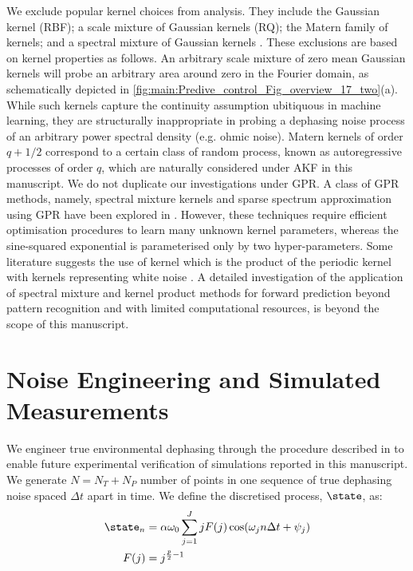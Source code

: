 We exclude popular kernel choices from analysis. They include the Gaussian kernel (RBF); a scale mixture of Gaussian kernels (RQ); the Matern family of kernels; and a spectral mixture of Gaussian kernels \cite{rasmussen2005gaussian, tobar2015learning}. These exclusions are based on kernel properties as follows. An arbitrary scale mixture of zero mean Gaussian kernels will probe an arbitrary area around zero in the Fourier domain, as schematically depicted in \cref{fig:main:Predive_control_Fig_overview_17_two}(a). While such kernels capture the continuity assumption ubitiquous in machine learning, they are structurally inappropriate in probing a dephasing noise process of an arbitrary power spectral density (e.g. ohmic noise).  Matern kernels of order $q + 1/2$ correspond to a certain class of random process, known as autoregressive processes of order $q$, which are naturally considered under AKF in this manuscript. We do not duplicate our investigations under GPR. A class of GPR methods, namely, spectral mixture kernels and sparse spectrum approximation using GPR have been explored in \cite{wilson2013, quia2010}. However, these techniques require efficient optimisation procedures to learn many unknown kernel parameters, whereas the sine-squared exponential is parameterised only by two hyper-parameters.  Some literature suggests the use of kernel which is the product of the periodic kernel with kernels representing white noise \cite{klenske2016gaussian}. A detailed investigation of the application of spectral mixture and kernel product methods for forward prediction beyond pattern recognition and with limited computational resources, is beyond the scope of this manuscript. 

\section{Noise Engineering and Simulated Measurements\label{sec:main:NoiseEngineering}}

We engineer true environmental dephasing through the procedure described in \cite{soare2014} to enable future experimental verification of simulations reported in this manuscript. We generate $ N = N_T + N_P$ number of points in one sequence of true dephasing noise spaced $\Delta t $ apart in time. We define the discretised process, $\state$, as:
\begin{align}
\state_n &= \alpha \omega_0 \sum_{j=1}^{J} j F(j)\cos(\omega_j n \Delta t + \psi_j) \\
F(j) & = j^{\frac{p}{2}-1} 
\end{align}

